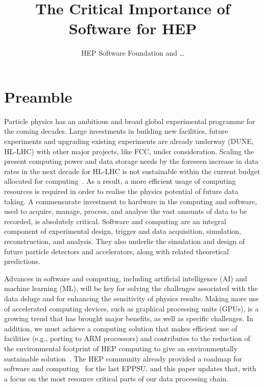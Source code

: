 \documentclass[10pt,a4paper]{article}
\begin{document}
\title{The Critical Importance of Software for HEP}

\author{HEP Software Foundation and \dots}

\maketitle

\section{Preamble}\label{preamble}

Particle physics has an ambitious and broad global experimental
programme for the coming decades. Large investments in building new
facilities, future experiments and upgrading existing experiments are
already underway (DUNE, HL-LHC) with other major projects, like FCC,
under consideration. Scaling the present computing power and data
storage needs by the foreseen increase in data rates in the next decade
for HL-LHC is not sustainable within the current budget allocated for
computing~\cite{CERN-LHCC-2022-005,Software:2815292}. As
a result, a more efficient usage of computing resources is required in
order to realise the physics potential of future data taking. A
commensurate investment to hardware in the computing and software, used
to acquire, manage, process, and analyse the vast amounts of data to be
recorded, is absolutely critical. Software and computing are an integral
component of experimental design, trigger and data acquisition,
simulation, reconstruction, and analysis. They also underlie the
simulation and design of future particle detectors and accelerators,
along with related theoretical predictions.

Advances in software and computing, including artificial intelligence
(AI) and machine learning (ML), will be key for solving the challenges
associated with the data deluge and for enhancing the sensitivity of
physics results. Making more use of accelerated computing devices, such
as graphical processing units (GPUs), is a growing trend that has
brought major benefits, as well as specific challenges. In addition, we
must achieve a computing solution that makes efficient use of facilities
(e.g., porting to ARM processors) and contributes to the reduction of
the environmental footprint of HEP computing to give an environmentally
sustainable solution~\cite{wlcgsust}. The
HEP community already provided a roadmap for software and
computing~\cite{hsfcwp} for the last
EPPSU, and this paper updates that, with a focus on the most resource
critical parts of our data processing chain.
\end{document}
